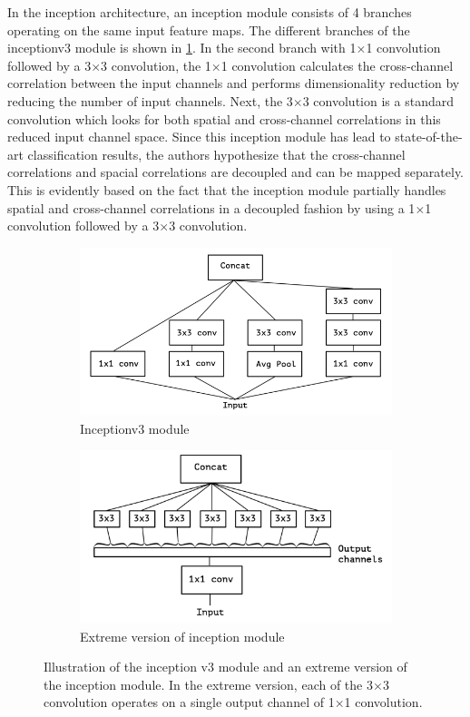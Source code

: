 In the inception architecture, an inception module consists of 4 branches operating on the same input feature maps. The different branches of the inceptionv3 module is shown in \ref{Fig:xceptiona}. In the second branch with 1$\times$1 convolution followed by a 3$\times$3 convolution, the 1$\times$1 convolution calculates the cross-channel correlation between the input channels and performs dimensionality reduction by reducing the number of input channels. Next, the 3$\times$3 convolution is a standard convolution which looks for both spatial and cross-channel correlations in this reduced input channel space. Since this inception module has lead to state-of-the-art classification results, the authors hypothesize that the cross-channel correlations and spacial correlations are decoupled and can be mapped separately. This is evidently based on the fact that the inception module partially handles spatial and cross-channel correlations in a decoupled fashion by using a 1$\times$1 convolution followed by a 3$\times$3 convolution. 

	\begin{figure}[!htb]
		\begin{subfigure}{.5\textwidth}
			\centering
			\includegraphics[width=.8\linewidth]{images/inception_v3}
			\caption{Inceptionv3 module}
			\label{Fig:xceptiona}
		\end{subfigure}
		\begin{subfigure}{.5\textwidth}
			\centering
			\includegraphics[width=.8\linewidth]{images/extreme_inception}
			\caption{Extreme version of inception module}
			\label{Fig:xceptionb}
		\end{subfigure}
		\caption{Illustration of the inception v3 module and an extreme version of the inception module. In the extreme version, each of the 3$\times$3 convolution operates on a single output channel of 1$\times$1 convolution.}
		\label{Fig:xception}
	\end{figure}

